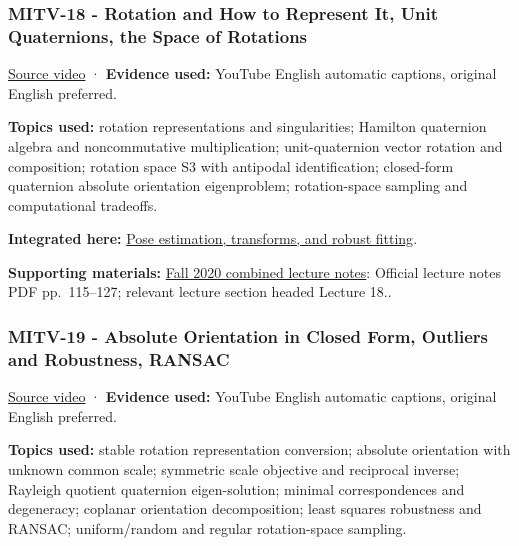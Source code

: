 \subsubsection{MITV-18 - Rotation and How to Represent It, Unit Quaternions, the Space of Rotations}\label{04-visual-computing-ii-ch036-mitv-18---rotation-and-how-to-represent-it-unit-quaternions-the-space-of-rotations}

\hypertarget{04-visual-computing-ii-ch036-mitv-18---rotation-and-how-to-represent-it-unit-quaternions-the-space-of-rotations}{}

\href{https://www.youtube.com/watch?v=uiG6KY0Cqd8}{Source video} · \textbf{Evidence used:} YouTube English automatic captions, original English preferred.

\textbf{Topics used:} rotation representations and singularities; Hamilton quaternion algebra and noncommutative multiplication; unit-quaternion vector rotation and composition; rotation space S3 with antipodal identification; closed-form quaternion absolute orientation eigenproblem; rotation-space sampling and computational tradeoffs.

\textbf{Integrated here:} \hyperref[04-visual-computing-ii-ch032-pose-estimation-transforms-and-robust-fitting]{Pose estimation, transforms, and robust fitting}.

\textbf{Supporting materials:} \href{https://ocw.mit.edu/courses/6-801-machine-vision-fall-2020/9ec44f69e72995c370b3797818ba01e6_MIT6_801F20_lectureNotes.pdf}{Fall 2020 combined lecture notes}: Official lecture notes PDF pp.~115--127; relevant lecture section headed Lecture 18..

\subsubsection{MITV-19 - Absolute Orientation in Closed Form, Outliers and Robustness, RANSAC}\label{04-visual-computing-ii-ch036-mitv-19---absolute-orientation-in-closed-form-outliers-and-robustness-ransac}

\hypertarget{04-visual-computing-ii-ch036-mitv-19---absolute-orientation-in-closed-form-outliers-and-robustness-ransac}{}

\href{https://www.youtube.com/watch?v=kigLhcTm_gg}{Source video} · \textbf{Evidence used:} YouTube English automatic captions, original English preferred.

\textbf{Topics used:} stable rotation representation conversion; absolute orientation with unknown common scale; symmetric scale objective and reciprocal inverse; Rayleigh quotient quaternion eigen-solution; minimal correspondences and degeneracy; coplanar orientation decomposition; least squares robustness and RANSAC; uniform/random and regular rotation-space sampling.

